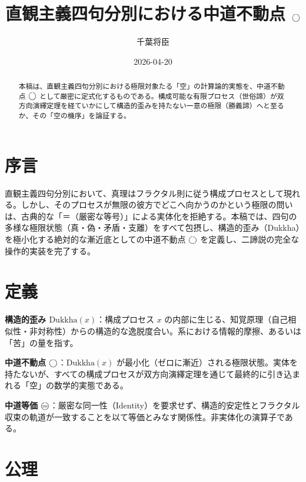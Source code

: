 \documentclass[11pt,a4paper]{article}
\newcommand{\Dukkha}{\mathrm{Dukkha}}
\begin{document}
\title{直観主義四句分別における中道不動点 $\bigcirc$}
\author{千葉将臣}
\date{2026-04-20}
\maketitle

\begin{abstract}
本稿は、直観主義四句分別における極限対象たる「空」の計算論的実態を、中道不動点 $\bigcirc$ として厳密に定式化するものである。構成可能な有限プロセス（世俗諦）が双方向演繹定理を経ていかにして構造的歪みを持たない一意の極限（勝義諦）へと至るか、その「空の機序」を論証する。
\end{abstract}

\section*{序言}
直観主義四句分別において、真理はフラクタル則に従う構成プロセスとして現れる。しかし、そのプロセスが無限の彼方でどこへ向かうのかという極限の問いは、古典的な「＝（厳密な等号）」による実体化を拒絶する。本稿では、四句の多様な極限状態（真・偽・矛盾・支離）をすべて包摂し、構造的歪み（Dukkha）を極小化する絶対的な漸近底としての中道不動点 $\bigcirc$ を定義し、二諦説の完全な操作的実装を完了する。

\section{定義}

\begin{description}[style=multiline, leftmargin=4.5cm]
  \item[定義 6.1] \textbf{構造的歪み $\Dukkha(x)$}：構成プロセス $x$ の内部に生じる、知覚原理（自己相似性・非対称性）からの構造的な逸脱度合い。系における情報的摩擦、あるいは「苦」の量を指す。
  \item[定義 6.2] \textbf{中道不動点 $\bigcirc$}：$\Dukkha(x)$ が最小化（ゼロに漸近）される極限状態。実体を持たないが、すべての構成プロセスが双方向演繹定理を通じて最終的に引き込まれる「空」の数学的実態である。
  \item[定義 6.3] \textbf{中道等価 $\mweq$}：厳密な同一性（Identity）を要求せず、構造的安定性とフラクタル収束の軌道が一致することを以て等価とみなす関係性。非実体化の演算子である。
\end{description}

\section{公理}
\end{document}

